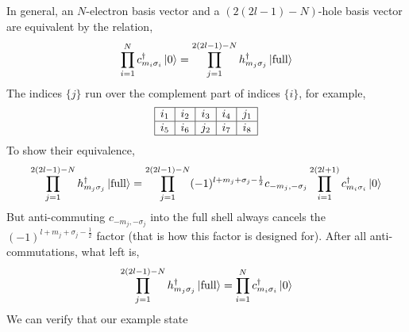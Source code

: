 \vspace{-2em}
In general, an $N$-electron basis vector and a $(2(2l-1)-N)$-hole basis vector
are equivalent by the relation,
\begin{equation*}
\prod_{i=1}^N c_{m_i\sigma_i}^\dagger \Ket{0} =
\prod_{j=1}^{2(2l-1)-N} h_{m_j\sigma_j}^\dagger \Ket{\text{full}}
\end{equation*}
The indices $\{j\}$ run over the complement part of indices $\{i\}$,
for example,
\begin{equation}
\begin{array}{|c|c|c|c|c|}
\hline
i_1 & i_2 & i_3 & i_4 & j_1 \\ \hline
i_5 & i_6 & j_2 & i_7 & i_8 \\
\hline
\end{array}
\end{equation}
To show their equivalence,
\begin{equation}
\prod_{j=1}^{2(2l-1)-N} h_{m_j\sigma_j}^\dagger \Ket{\text{full}}
= \prod_{j=1}^{2(2l-1)-N} (-1)^{l+m_j+\sigma_j-\frac{1}{2}} c_{-m_j,-\sigma_j} \prod_{i=1}^{2(2l+1)} c_{m_i\sigma_i}^\dagger \Ket{0}
\end{equation}
But anti-commuting $c_{-m_j,-\sigma_j}$ into the full shell always cancels the
$(-1)^{l+m_j+\sigma_j-\frac{1}{2}}$ factor (that is how this factor is designed for).
After all anti-commutations, what left is,
\begin{equation}
\prod_{j=1}^{2(2l-1)-N} h_{m_j\sigma_j}^\dagger \Ket{\text{full}}
= \prod_{i=1}^N c_{m_i\sigma_i}^\dagger \Ket{0}
\end{equation}
%
We can verify that our example state
